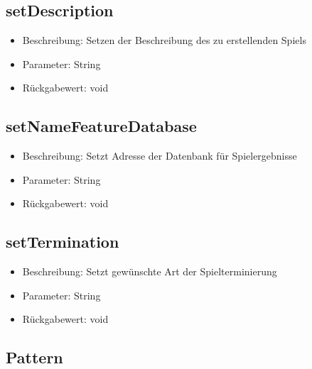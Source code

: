 \documentclass[a4paper]{scrreprt}
\begin{document}
	\subsection{setDescription}
	\begin{itemize}
		\item Beschreibung: Setzen der Beschreibung des zu erstellenden Spiels
		\item Parameter: String
		\item Rückgabewert: void
	\end{itemize}
	\subsection{setNameFeatureDatabase}
	\begin{itemize}
		\item Beschreibung: Setzt Adresse der Datenbank für Spielergebnisse
		\item Parameter: String
		\item Rückgabewert: void
	\end{itemize}
	\subsection{setTermination}
	\begin{itemize}
		\item Beschreibung: Setzt gewünschte Art der Spielterminierung
		\item Parameter: String
		\item Rückgabewert: void
	\end{itemize}

	\subsection{Pattern}
\end{document}
